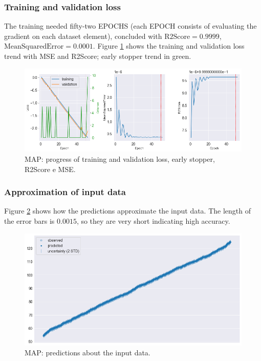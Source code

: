 \subsubsection{Training and validation loss}
The training needed fifty-two EPOCHS (each EPOCH consists of evaluating the gradient on each dataset element), concluded with $\text{R2Score}=0.9999$, $\text{MeanSquaredError}=0.0001$. Figure \ref{MAP - loss} shows the training and validation loss trend with MSE and R2Score; early stopper trend in green.
\begin{figure}[h]
    \centering
    \includegraphics[width=1\textwidth]{images/Training (risultati)/MAP/MAP - loss.png}
    \caption{MAP: progress of training and validation loss, early stopper, R2Score e MSE.}
    \label{MAP - loss}
\end{figure}

\newpage



\subsubsection{Approximation of input data}
Figure \ref{MAP - inference} shows how the predictions approximate the input data. The length of the error bars is $0.0015$, so they are very short indicating high accuracy.

\begin{figure}[!htb]
    \centering
    \includegraphics[width=1\textwidth]{images/Training (risultati)/MAP/MAP - inference.png}
    \caption{MAP: predictions about the input data.}
    \label{MAP - inference}
\end{figure}




